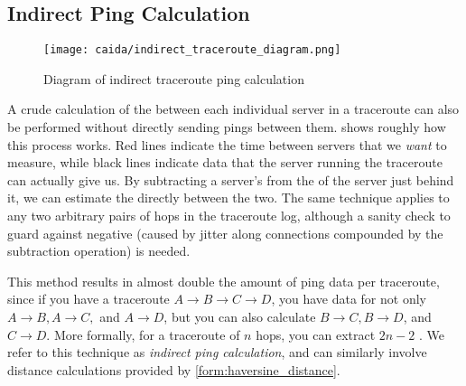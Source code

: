 \subsection{Indirect Ping Calculation}

\begin{figure}[h]
    \centering
    \texttt{[image: caida/indirect\_traceroute\_diagram.png]}
    \caption{Diagram of indirect traceroute ping calculation}
    \label{fig:indirect_ping_diagram}
\end{figure}

A crude calculation of the \rtt between each individual server in a traceroute can also be performed without directly sending pings between them.  shows roughly how this process works. Red lines indicate the time between servers that we \textit{want} to measure, while black lines indicate data that the server running the traceroute can actually give us. By subtracting a server's \rtt from the \rtt of the server just behind it, we can estimate the \rtt directly between the two. The same technique applies to any two arbitrary pairs of hops in the traceroute log, although a sanity check to guard against negative \rtts (caused by jitter along connections compounded by the subtraction operation) is needed.

This method results in almost double the amount of ping data per traceroute, since if you have a traceroute $A\rightarrow B\rightarrow C\rightarrow D$, you have data for not only $A\rightarrow B, A\rightarrow C,$ and $A\rightarrow D$, but you can also calculate $B\rightarrow C, B\rightarrow D$, and $C\rightarrow D$. More formally, for a traceroute of $n$ hops, you can extract $2n-2$ \rtts. We refer to this technique as \textit{indirect ping calculation}, and can similarly involve distance calculations provided by \cref{form:haversine_distance}.
